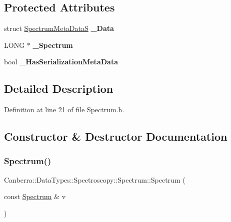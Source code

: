 \subsection*{Protected Attributes}
\begin{DoxyCompactItemize}
\item 
\mbox{\label{class_canberra_1_1_data_types_1_1_spectroscopy_1_1_spectrum_a783ddad678dbcaa5a2cc52fa76a8bcae}} 
struct \hyperlink{struct_spectrum_meta_data_s}{Spectrum\+Meta\+DataS} {\bfseries \+\_\+\+Data}
\item 
\mbox{\label{class_canberra_1_1_data_types_1_1_spectroscopy_1_1_spectrum_a567930b8305b289a1628dd794c226b4f}} 
L\+O\+NG $\ast$ {\bfseries \+\_\+\+Spectrum}
\item 
\mbox{\label{class_canberra_1_1_data_types_1_1_spectroscopy_1_1_spectrum_a1cde349996d4ef27cc48e23bce5119d4}} 
bool {\bfseries \+\_\+\+Has\+Serialization\+Meta\+Data}
\end{DoxyCompactItemize}


\subsection{Detailed Description}


Definition at line 21 of file Spectrum.\+h.



\subsection{Constructor \& Destructor Documentation}
\mbox{\label{class_canberra_1_1_data_types_1_1_spectroscopy_1_1_spectrum_a1e31fc3ab2977d2db978b113f3da35d5_a1e31fc3ab2977d2db978b113f3da35d5}} 
\subsubsection{\texorpdfstring{Spectrum()}{Spectrum()}\hspace{0.1cm}{\footnotesize\ttfamily [1/3]}}
{\footnotesize\ttfamily Canberra\+::\+Data\+Types\+::\+Spectroscopy\+::\+Spectrum\+::\+Spectrum (\begin{DoxyParamCaption}\item[{const \hyperlink{class_canberra_1_1_data_types_1_1_spectroscopy_1_1_spectrum}{Spectrum} \&}]{v }\end{DoxyParamCaption})}

